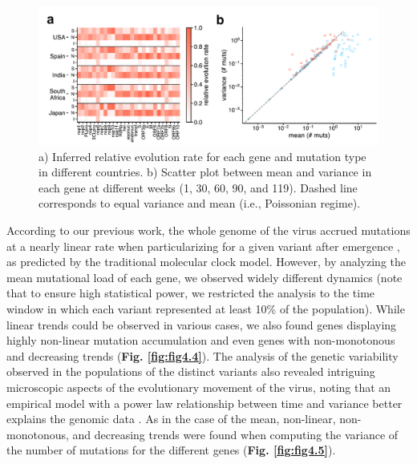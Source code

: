 \begin{figure}[ht!]
    \centering
    \includegraphics[width=\linewidth]{assets/Ch4Fig3.pdf}
    \caption{a) Inferred relative evolution rate for each gene and mutation type in different countries. b) Scatter plot between mean and variance in each gene at different weeks (1, 30, 60, 90, and 119). Dashed line corresponds to equal variance and mean (i.e., Poissonian regime).}\label{fig:fig4.3}
\end{figure}

According to our previous work, the whole genome of the virus accrued mutations at a nearly linear rate when particularizing for a given variant after emergence \cite{goiriz2023variant}, as predicted by the traditional molecular clock model. However, by analyzing the mean mutational load of each gene, we observed widely different dynamics (note that to ensure high statistical power, we restricted the analysis to the time window in which each variant represented at least 10\% of the population). While linear trends could be observed in various cases, we also found genes displaying highly non-linear mutation accumulation and even genes with non-monotonous and decreasing trends (\textbf{Fig. \ref{fig:fig4.4}}). The analysis of the genetic variability observed in the populations of the distinct variants also revealed intriguing microscopic aspects of the evolutionary movement of the virus, noting that an empirical model with a power law relationship between time and variance better explains the genomic data \cite{goiriz2023variant}. As in the case of the mean, non-linear, non-monotonous, and decreasing trends were found when computing the variance of the number of mutations for the different genes (\textbf{Fig. \ref{fig:fig4.5}}).

